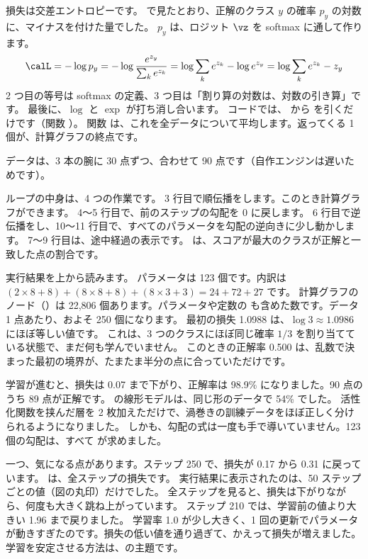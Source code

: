 損失は交差エントロピーです。
で見たとおり、正解のクラス $y$ の確率 $p_y$ の対数に、マイナスを付けた量でした。
$p_y$ は、ロジット $\vz$ を softmax に通して作ります。
\begin{equation}
\calL = -\log p_y = -\log\frac{e^{z_y}}{\sum_k e^{z_k}}
 = \log\sum_k e^{z_k} - \log e^{z_y}
 = \log\sum_k e^{z_k} - z_y
\label{eq:nn-ce-logits}
\end{equation}
2 つ目の等号は softmax の定義、3 つ目は「割り算の対数は、対数の引き算」です。
最後に、$\log$ と $\exp$ が打ち消し合います。
コードでは、 から  を引くだけです（関数 ）。
関数  は、これを全データについて平均します。返ってくる  1 個が、計算グラフの終点です。

データは、3 本の腕に 30 点ずつ、合わせて 90 点です（自作エンジンは遅いためです）。

{\par}

ループの中身は、4 つの作業です。
3 行目で順伝播をします。このとき計算グラフができます。
4〜5 行目で、前のステップの勾配を 0 に戻します。
6 行目で逆伝播をし、10〜11 行目で、すべてのパラメータを勾配の逆向きに少し動かします。
7〜9 行目は、途中経過の表示です。 は、スコアが最大のクラスが正解と一致した点の割合です。

実行結果を上から読みます。
パラメータは 123 個です。内訳は $(2\times8+8)+(8\times8+8)+(8\times3+3)=24+72+27$ です。
計算グラフのノード（）は 22,806 個あります。パラメータや定数の  も含めた数です。データ 1 点あたり、およそ 250 個になります。
最初の損失 1.0988 は、$\log 3\approx1.0986$ にほぼ等しい値です。
これは、3 つのクラスにほぼ同じ確率 $1/3$ を割り当てている状態で、まだ何も学んでいません。
このときの正解率 0.500 は、乱数で決まった最初の境界が、たまたま半分の点に合っていただけです。

学習が進むと、損失は 0.07 まで下がり、正解率は 98.9\% になりました。90 点のうち 89 点が正解です。
の線形モデルは、同じ形のデータで 54\% でした。
活性化関数を挟んだ層を 2 枚加えただけで、渦巻きの訓練データをほぼ正しく分けられるようになりました。
しかも、勾配の式は一度も手で導いていません。123 個の勾配は、すべて  が求めました。

一つ、気になる点があります。ステップ 250 で、損失が 0.17 から 0.31 に戻っています。
は、全ステップの損失です。
実行結果に表示されたのは、50 ステップごとの値（図の丸印）だけでした。
全ステップを見ると、損失は下がりながら、何度も大きく跳ね上がっています。
ステップ 210 では、学習前の値より大きい 1.96 まで戻りました。
学習率 1.0 が少し大きく、1 回の更新でパラメータが動きすぎたのです。損失の低い値を通り過ぎて、かえって損失が増えました。
学習を安定させる方法は、の主題です。

